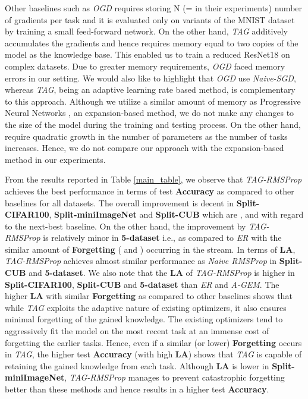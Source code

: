 \documentclass{article} \usepackage{collas2022_conference,times}
\begin{document}
Other baselines such as \textit{OGD} \citep{farajtabar2020orthogonal} requires storing N (= in their experiments) number of gradients per task and it is evaluated only on variants of the MNIST dataset by training a small feed-forward network. On the other hand, \textit{TAG} additively accumulates the gradients and hence requires memory equal to two copies of the model as the knowledge base. This enabled us to train a reduced ResNet18 on complex datasets. Due to greater memory requirements, \textit{OGD} faced memory errors in our setting. We would also like to highlight that \textit{OGD} use \textit{Naive-SGD}, whereas \textit{TAG}, being an adaptive learning rate based method, is complementary to this approach.{ Although we utilize a similar amount of memory as Progressive Neural Networks \cite{rusu2016progressive}, an expansion-based method, we do not make any changes to the size of the model during the training and testing process. On the other hand, \cite{rusu2016progressive} require quadratic growth in the number of parameters as the number of tasks increases. Hence, we do not compare our approach with the expansion-based method in our experiments.}
    


	From the results reported in Table \ref{main_table}, we observe that \textit{TAG-RMSProp} achieves the best performance in terms of test \textbf{Accuracy} as compared to other baselines for all datasets. The overall improvement is decent in \textbf{Split-CIFAR100}, \textbf{Split-miniImageNet} and \textbf{Split-CUB} which are ,  and  with regard to the next-best baseline. On the other hand, the improvement by \textit{TAG-RMSProp} is relatively minor in \textbf{5-dataset} i.e.,  as compared to \textit{ER} with the similar amount of \textbf{Forgetting} ( and ) occurring in the stream. In terms of \textbf{LA}, \textit{TAG-RMSProp} achieves almost similar performance as \textit{Naive RMSProp} in \textbf{Split-CUB} and \textbf{5-dataset}. We also note that the \textbf{LA} of \textit{TAG-RMSProp} is higher in \textbf{Split-CIFAR100}, \textbf{Split-CUB} and \textbf{5-dataset} than \textit{ER} and \textit{A-GEM}. 
The higher \textbf{LA} with similar \textbf{Forgetting} as compared to other baselines shows that while \textit{TAG} exploits the adaptive nature of existing optimizers, it also ensures minimal forgetting of the gained knowledge. The existing optimizers tend to aggressively fit the model on the most recent task at an immense cost of forgetting the earlier tasks. Hence, even if a similar (or lower) \textbf{Forgetting} occurs in \textit{TAG}, the higher test \textbf{Accuracy} (with high \textbf{LA}) shows that \textit{TAG} is capable of retaining the gained knowledge from each task. Although \textbf{LA} is lower in \textbf{Split-miniImageNet}, \textit{TAG-RMSProp} manages to prevent catastrophic forgetting better than these methods and hence results in a higher test \textbf{Accuracy}.
\end{document}
